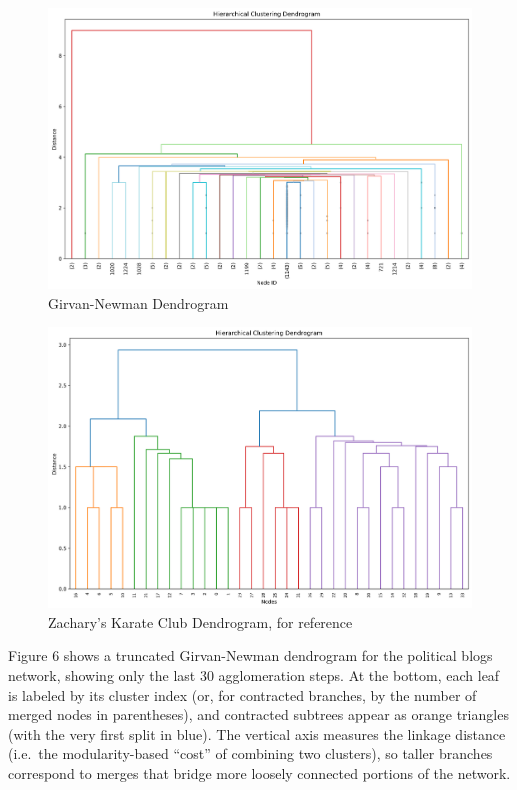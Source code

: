 \documentclass{article}
\begin{document}
\begin{figure}[H]
  \centering
  \includegraphics[width=1\textwidth]{../images/dendrogram.png}
  \caption{Girvan-Newman Dendrogram}
  \label{fig:gn-dendrogram}
\end{figure}

\begin{figure}[H]
  \centering
  \includegraphics[width=1\textwidth]{../images/karate_club_dendrogram.png}
  \caption{Zachary's Karate Club Dendrogram, for reference}
  \label{fig:zkc-dendrogram}
\end{figure}

Figure 6 shows a truncated Girvan-Newman dendrogram for the political blogs network, showing only the last 30 agglomeration steps.  
At the bottom, each leaf is labeled by its cluster index (or, for contracted branches, by the number of merged nodes in parentheses), and contracted subtrees appear as orange triangles (with the very first split in blue).  
The vertical axis measures the linkage distance (i.e.\ the modularity-based “cost” of combining two clusters), so taller branches correspond to merges that bridge more loosely connected portions of the network.
\end{document}
